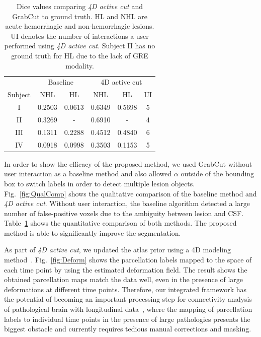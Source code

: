 \documentclass{article}
\begin{document}
\begin{table} [ht]
\centering
\begin{tabular}{c|cc|cc|c}
\hline
 &  \multicolumn{2}{c}{Baseline} &  \multicolumn{3}{|c}{4D active cut}\\
\cline{2-6}
\multirow{1}{*}{Subject}  & NHL & HL & NHL & HL & UI\\

I  & 0.2503 & 0.0613  & 0.6349 & 0.5698 & 5\\ %
II & 0.3269 & -  & 0.6910 & -   & 4 \\ %
III  & 0.1311 & 0.2288   & 0.4512 & 0.4840 & 6 \\ %
IV   & 0.0918 & 0.0998   & 0.3503 & 0.1153 & 5 \\ \hline
\end{tabular}
\caption{ Dice values comparing \emph{4D active cut} and GrabCut to ground
  truth. HL and NHL are acute hemorrhagic and non-hemorrhagic lesions. UI
  denotes the number of interactions a user performed using \emph{4D active cut}.
  Subject II has no ground truth for HL due to the lack of GRE modality.}
\label{tab:DiceResult}
\end{table}

In order to show the efficacy of the proposed method, we used GrabCut
without user interaction as a baseline method and also allowed $\alpha$ outside
of the bounding box to switch labels in order to detect multiple lesion objects.
Fig.~\ref{fig:QualComp} shows the qualitative comparison of the baseline method
and \emph{4D active cut}. Without user interaction, the baseline algorithm detected a
large number of false-positive voxels due to the ambiguity between lesion
and CSF. Table~\ref{tab:DiceResult} shows the quantitative comparison of both
methods. The proposed method is able to significantly improve the
segmentation.

As part of \emph{4D active cut}, we updated the atlas prior using a 4D
modeling
method~\cite{WangMBIA2013}. Fig.~\ref{fig:Deform} shows the parcellation labels
mapped to the space of each time point by using the estimated deformation field.
The result shows the obtained parcellation maps match the data well, even in the
presence of large deformations at different time points.  Therefore, our
integrated framework has the potential of becoming an important processing step for connectivity
analysis of pathological brain with longitudinal data~\cite{Irimia2012}, where
the mapping of parcellation labels to individual time points in the presence of large pathologies presents the biggest obstacle and currently requires tedious manual corrections and masking.
\end{document}
